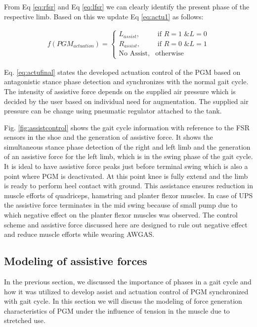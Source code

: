 \documentclass[paper,JRM,paper]{jaciiiarticle}
\begin{document}
From Eq \ref{eq:rfsr} and Eq \ref{eq:lfsr} we can clearly identify the present phase of the respective limb. Based on this we update Eq \ref{eq:actu1} as follows:

\begin{align}\label{eq:actufinal}
f(PGM_{actuation}) = ^{}
\begin{cases}
L_{assist},& \text{ if } R = 1\text{ \& } L = 0\\ 
R_{assist},& \text{ if } R = 0\text{ \& } L = 1\\ 
\text{No Assist}, & \text{otherwise}
\end{cases}
\end{align}

Eq. \ref{eq:actufinal} states the developed actuation control of the PGM based on antagonistic stance phase detection and synchronizes with the normal gait cycle. The intensity of assistive force depends on the supplied air pressure which is decided by the user based on individual need for augmentation. The supplied air pressure can be change using pneumatic regulator attached to the tank. 

Fig. \ref{fig:assistcontrol} shows the gait cycle information with reference to the FSR sensors in the shoe and the generation of assistive force. It shows the simultaneous stance phase detection of the right and left limb and the generation of an assistive force for the left limb, which is in the swing phase of the gait cycle. It is ideal to have assistive force peaks just before terminal swing which is also a point where PGM is deactivated. At this point knee is fully extend and the limb is ready to perform heel contact with ground. This assistance ensures reduction in muscle efforts of quadriceps, hamstring and planter flexor muscles. In case of UPS \cite{13} the assistive force terminates in the mid swing because of small pump due to which negative effect on the planter flexor muscles was observed. The control scheme and assistive force discussed here are designed to rule out negative effect and reduce muscle efforts while wearing AWGAS.

\subsection{Modeling of assistive forces}
In the previous section, we discussed the importance of phases in a gait cycle and how it was utilized to develop assist and actuation control of PGM synchronized with gait cycle. In this section we will discuss the modeling of force generation characteristics of PGM under the influence of tension in the muscle due to stretched use. 
\end{document}
